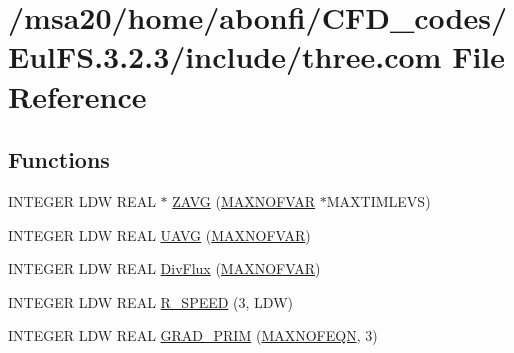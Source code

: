 \hypertarget{msa20_2home_2abonfi_2_c_f_d__codes_2_eul_f_s_83_82_83_2include_2three_8com}{\section{/msa20/home/abonfi/\-C\-F\-D\-\_\-codes/\-Eul\-F\-S.3.2.3/include/three.com File Reference}
\label{msa20_2home_2abonfi_2_c_f_d__codes_2_eul_f_s_83_82_83_2include_2three_8com}
}
\subsection*{Functions}
\begin{DoxyCompactItemize}
\item 
I\-N\-T\-E\-G\-E\-R L\-D\-W R\-E\-A\-L $\ast$ \hyperlink{msa20_2home_2abonfi_2_c_f_d__codes_2_eul_f_s_83_82_83_2include_2three_8com_a63efc6c7080809fef3845bb143f55d41}{Z\-A\-V\-G} (\hyperlink{msa20_2home_2abonfi_2_c_f_d__codes_2_eul_f_s_83_82_83_2include_2paramt_8h_ae08fa28f58a75033834af08d1f9359ce}{M\-A\-X\-N\-O\-F\-V\-A\-R} $\ast$M\-A\-X\-T\-I\-M\-L\-E\-V\-S)
\item 
I\-N\-T\-E\-G\-E\-R L\-D\-W R\-E\-A\-L \hyperlink{msa20_2home_2abonfi_2_c_f_d__codes_2_eul_f_s_83_82_83_2include_2three_8com_ad59e2d047908ce4ed3fc820d45a326fb}{U\-A\-V\-G} (\hyperlink{msa20_2home_2abonfi_2_c_f_d__codes_2_eul_f_s_83_82_83_2include_2paramt_8h_ae08fa28f58a75033834af08d1f9359ce}{M\-A\-X\-N\-O\-F\-V\-A\-R})
\item 
I\-N\-T\-E\-G\-E\-R L\-D\-W R\-E\-A\-L \hyperlink{msa20_2home_2abonfi_2_c_f_d__codes_2_eul_f_s_83_82_83_2include_2three_8com_a540efd196c8ba8ffacd2054d7cd37c3d}{Div\-Flux} (\hyperlink{msa20_2home_2abonfi_2_c_f_d__codes_2_eul_f_s_83_82_83_2include_2paramt_8h_ae08fa28f58a75033834af08d1f9359ce}{M\-A\-X\-N\-O\-F\-V\-A\-R})
\item 
I\-N\-T\-E\-G\-E\-R L\-D\-W R\-E\-A\-L \hyperlink{msa20_2home_2abonfi_2_c_f_d__codes_2_eul_f_s_83_82_83_2include_2three_8com_ab9b65ce69bcdbe659e8abbf2992e665d}{R\-\_\-\-S\-P\-E\-E\-D} (3, L\-D\-W)
\item 
I\-N\-T\-E\-G\-E\-R L\-D\-W R\-E\-A\-L \hyperlink{msa20_2home_2abonfi_2_c_f_d__codes_2_eul_f_s_83_82_83_2include_2three_8com_a92eab26680b58f9932bafdd58c32b8e2}{G\-R\-A\-D\-\_\-\-P\-R\-I\-M} (\hyperlink{msa20_2home_2abonfi_2_c_f_d__codes_2_eul_f_s_83_82_83_2include_2paramt_8h_a1cc2b3e0df194e3b8ad34f033bf6547c}{M\-A\-X\-N\-O\-F\-E\-Q\-N}, 3)

\end{DoxyCompactItemize}
